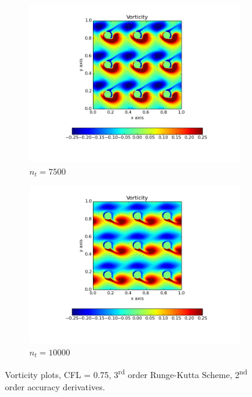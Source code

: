 \documentclass[10pt, a4paper]{article}
\begin{document}
\begin{figure}[htb!]
\begin{subfigure}{.5\textwidth}
  \includegraphics[width=1.1\linewidth, clip=true, trim=1cm 1cm 1cm 1cm]{q3_0003}
  \caption{$n_t = 7500$}
  \label{fig:sub1}
\end{subfigure}%
\begin{subfigure}{.5\textwidth}
  \centering
  \includegraphics[width=1.1\linewidth, clip=true, trim=1cm 1cm 1cm 1cm]{q3_0004}
  \caption{$n_t = 10000$}
  \label{fig:sub2}
\end{subfigure}
\caption{Vorticity plots, CFL = 0.75, 3\textsuperscript{rd} order Runge-Kutta Scheme, 2\textsuperscript{nd} order accuracy derivatives.}
\label{fig:test}
\end{figure}

\end{document}
